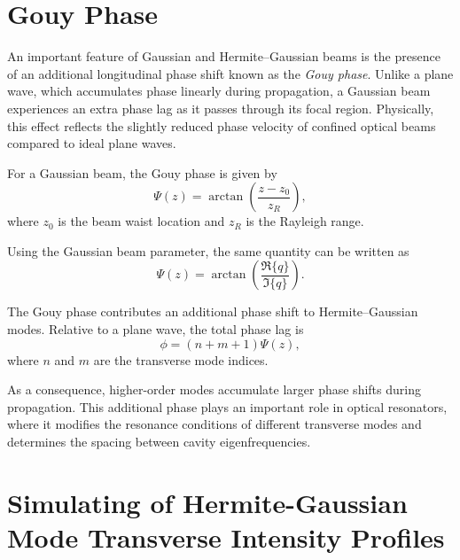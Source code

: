 \documentclass{report}
\begin{document}
\section{Gouy Phase}

An important feature of Gaussian and Hermite--Gaussian beams is the presence of an additional longitudinal phase shift known as the \textit{Gouy phase}. Unlike a plane wave, which accumulates phase linearly during propagation, a Gaussian beam experiences an extra phase lag as it passes through its focal region. Physically, this effect reflects the slightly reduced phase velocity of confined optical beams compared to ideal plane waves.

For a Gaussian beam, the Gouy phase is given by
\begin{equation}
\Psi(z)
=
\arctan\left(
\frac{z-z_0}{z_R}
\right),
\end{equation}
where $z_0$ is the beam waist location and $z_R$ is the Rayleigh range.

Using the Gaussian beam parameter, the same quantity can be written as
\begin{equation}
\Psi(z)
=
\arctan\left(
\frac{\Re\{q\}}
     {\Im\{q\}}
\right).
\end{equation}

The Gouy phase contributes an additional phase shift to Hermite--Gaussian modes. Relative to a plane wave, the total phase lag is
\begin{equation}
\phi
=
(n+m+1)\Psi(z),
\end{equation}
where $n$ and $m$ are the transverse mode indices.

As a consequence, higher-order modes accumulate larger phase shifts during propagation. This additional phase plays an important role in optical resonators, where it modifies the resonance conditions of different transverse modes and determines the spacing between cavity eigenfrequencies.

\section{Simulating of Hermite-Gaussian Mode Transverse Intensity Profiles}
\end{document}
